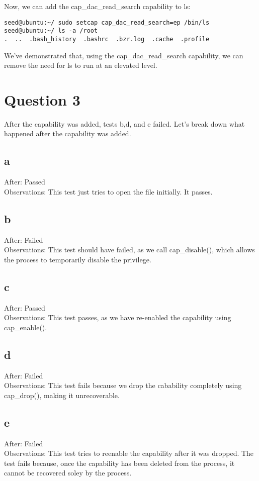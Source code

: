 \documentclass[10pt,letterpaper]{article}
\begin{document}
Now, we can add the cap\_dac\_read\_search capability to ls:
\begin{lstlisting}
seed@ubuntu:~/ sudo setcap cap_dac_read_search=ep /bin/ls
seed@ubuntu:~/ ls -a /root
.  ..  .bash_history  .bashrc  .bzr.log  .cache  .profile
\end{lstlisting}

We've demonstrated that, using the cap\_dac\_read\_search capability, we can remove
the need for ls to run at an elevated level.

\section*{Question 3}
After the capability was added, tests b,d, and e failed. Let's break down what
happened after the capability was added.
\subsection*{a}
After: Passed\\
Observations: This test just tries to open the file initially. It passes. 

\subsection*{b}
After: Failed\\
Observations: This test should have failed, as we call cap\_disable(), which
allows the process to temporarily disable the privilege.

\subsection*{c}
After: Passed\\
Observations: This test passes, as we have re-enabled the capability using
cap\_enable().

\subsection*{d}
After: Failed\\
Observations: This test fails because we drop the cabability completely using
cap\_drop(), making it unrecoverable.

\subsection*{e}
After: Failed\\
Observations: This test tries to reenable the capability after it was dropped.
The test fails because, once the capability has been deleted from the process,
it cannot be recovered soley by the process.
\end{document}
